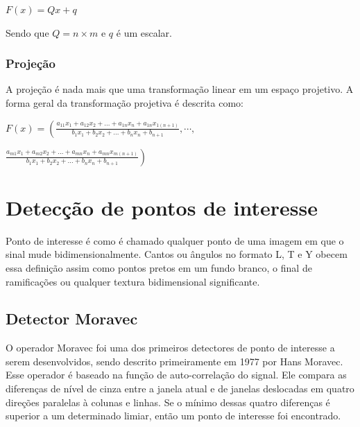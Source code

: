 \documentclass[9pt, a4paper, nofonttune, journal]{IEEEtran}
\begin{document}
\begin{center}
$F(x)=Qx+q$\end{center}
Sendo que $Q=n\times m$ e $q$ é um escalar. \cite{CGPPBook1}

\subsubsection{Projeção}

A projeção é nada mais que uma transformação linear em um espaço projetivo.\cite{CGPPBook1}
A forma geral da transformação projetiva é descrita como:

$F(x)=\left( \frac{a_{11}x_{1}+a_{12}x_{2}+...+a_{1n}x_{n}+a_{1n}x_{1(n+1)}}{b_{1}x_{1}+b_{2}x_{2}+...+b_{n}x_{n}+b_{n+1}},\cdots,\right.$

\begin{center}
$\left. \frac{a_{m1}x_{1}+a_{m2}x_{2}+...+a_{mn}x_{n}+a_{mn}x_{m(n+1)}}{b_{1}x_{1}+b_{2}x_{2}+...+b_{n}x_{n}+b_{n+1}} \right)$\end{center}



\section{Detecção de pontos de interesse}
\PARstart Ponto de interesse é como é chamado qualquer ponto de uma imagem em que o sinal mude bidimensionalmente. Cantos ou ângulos
no formato L, T e Y obecem essa definição assim como pontos pretos em um fundo branco, o final de ramificações ou qualquer textura bidimensional
significante.\cite{Coderlia1}


\subsection{Detector Moravec}
O operador Moravec foi uma dos primeiros detectores de ponto de interesse a serem desenvolvidos, sendo descrito primeiramente 
em 1977 por Hans Moravec.\cite{Moravec1}
Esse operador é baseado na função de auto-correlação do signal. Ele compara as diferenças de nível de cinza entre a janela atual e de janelas 
deslocadas em quatro direções paralelas à colunas e linhas. Se o mínimo dessas quatro diferenças é superior a um determinado limiar, então um ponto de interesse
foi encontrado.\cite{Coderlia1}
  
\end{document}
